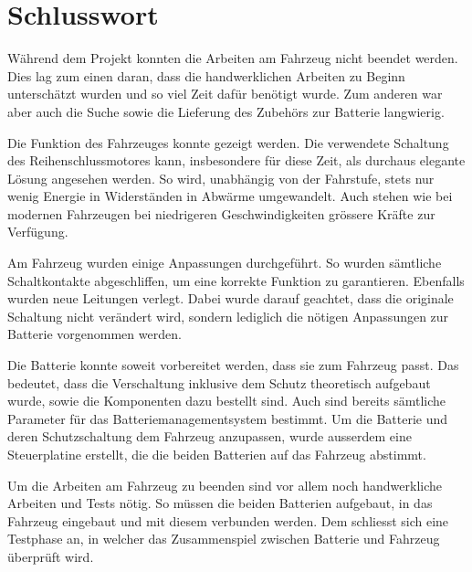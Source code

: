 \chapter{Schlusswort}
Während dem Projekt konnten die Arbeiten am Fahrzeug nicht beendet werden. Dies lag zum einen daran, dass die handwerklichen Arbeiten zu Beginn unterschätzt wurden und so viel Zeit dafür benötigt wurde. Zum anderen war aber auch die Suche sowie die Lieferung des Zubehörs zur Batterie langwierig.

Die Funktion des Fahrzeuges konnte gezeigt werden. Die verwendete Schaltung des Reihenschlussmotores kann, insbesondere für diese Zeit, als durchaus elegante Lösung angesehen werden. So wird, unabhängig von der Fahrstufe, stets nur wenig Energie in Widerständen in Abwärme umgewandelt. Auch stehen wie bei modernen Fahrzeugen bei niedrigeren Geschwindigkeiten grössere Kräfte zur Verfügung.

Am Fahrzeug wurden einige Anpassungen durchgeführt. So wurden sämtliche Schaltkontakte abgeschliffen, um eine korrekte Funktion zu garantieren. Ebenfalls wurden neue Leitungen verlegt. Dabei wurde darauf geachtet, dass die originale Schaltung nicht verändert wird, sondern lediglich die nötigen Anpassungen zur Batterie vorgenommen werden.

Die Batterie konnte soweit vorbereitet werden, dass sie zum Fahrzeug passt. Das bedeutet, dass die Verschaltung inklusive dem Schutz theoretisch aufgebaut wurde, sowie die Komponenten dazu bestellt sind. Auch sind bereits sämtliche Parameter für das Batteriemanagementsystem bestimmt. Um die Batterie und deren Schutzschaltung dem Fahrzeug anzupassen, wurde ausserdem eine Steuerplatine erstellt, die die beiden Batterien auf das Fahrzeug abstimmt.

Um die Arbeiten am Fahrzeug zu beenden sind vor allem noch handwerkliche Arbeiten und Tests nötig. So müssen die beiden Batterien aufgebaut, in das Fahrzeug eingebaut und mit diesem verbunden werden. Dem schliesst sich eine Testphase an, in welcher das Zusammenspiel zwischen Batterie und Fahrzeug überprüft wird. 